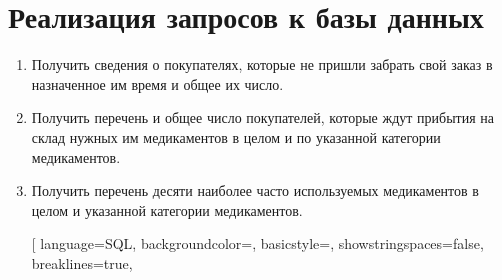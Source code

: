 \documentclass[a4paper]{article}
\begin{document}
	\section{Реализация запросов к базы данных}
		\begin{enumerate}			
			\item Получить сведения о покупателях, которые не пришли забрать свой заказ в назначенное им время и общее их число.
				
				
			\item Получить перечень и общее число покупателей, которые ждут прибытия на склад нужных им медикаментов в целом и по указанной категории медикаментов.
				
				
				
				
			\item Получить перечень десяти наиболее часто используемых медикаментов в целом и указанной категории медикаментов.
				
				[
					language=SQL,
					backgroundcolor=\color{backcolour},
					basicstyle=\scriptsize,
					showstringspaces=false,
					breaklines=true,

\end{enumerate}
\end{document}
